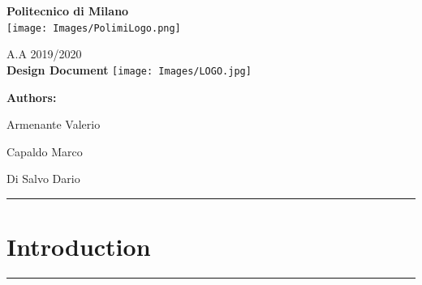 \documentclass[12pt]{article}
\begin{document}
\onehalfspacing
\begin{center}
	{\huge {\textbf{Politecnico di Milano}}}
	 	\vspace{7mm}\\
	 	
 	 	\texttt{[image: Images/PolimiLogo.png]}
	\end{center}

\begin{center}
	     \vspace{5mm}
		{\Large A.A 2019/2020} 
		\vspace{1cm}\\
		{\Large {\textbf{Design Document}}}   
		\texttt{[image: Images/LOGO.jpg]}
    \end{center}
          
\begin{flushright}
         
	 	 
	 	{\huge {\Large \textbf{Authors:}}}
	 	 
	 	{Armenante Valerio}
	 	
	 	{Capaldo Marco}
	 	
	 	{Di Salvo Dario}
	\end{flushright}



\newpage
\hrule
\hypersetup{hidelinks}\tableofcontents

\vspace{0.5mm}
\vspace{0.24mm}

\newpage

\section{Introduction}
\hrule
\vspace{1cm}
\end{document}
